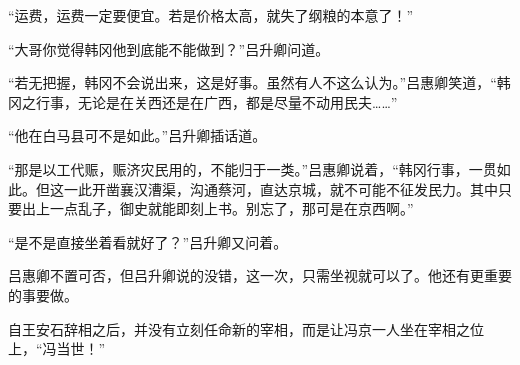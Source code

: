 “运费，运费一定要便宜。若是价格太高，就失了纲粮的本意了！”

“大哥你觉得韩冈他到底能不能做到？”吕升卿问道。

“若无把握，韩冈不会说出来，这是好事。虽然有人不这么认为。”吕惠卿笑道，“韩冈之行事，无论是在关西还是在广西，都是尽量不动用民夫……”

“他在白马县可不是如此。”吕升卿插话道。

“那是以工代赈，赈济灾民用的，不能归于一类。”吕惠卿说着，“韩冈行事，一贯如此。但这一此开凿襄汉漕渠，沟通蔡河，直达京城，就不可能不征发民力。其中只要出上一点乱子，御史就能即刻上书。别忘了，那可是在京西啊。”

“是不是直接坐着看就好了？”吕升卿又问着。

吕惠卿不置可否，但吕升卿说的没错，这一次，只需坐视就可以了。他还有更重要的事要做。

自王安石辞相之后，并没有立刻任命新的宰相，而是让冯京一人坐在宰相之位上，“冯当世！”

